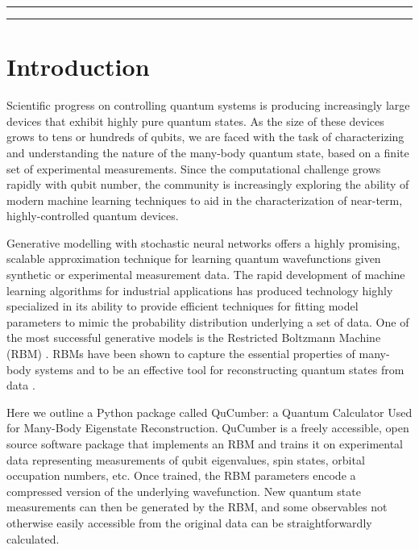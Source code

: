 \documentclass[submission, Phys]{SciPost}
\begin{document}
\vspace{10pt}
\noindent\rule{\textwidth}{1pt}
\tableofcontents\thispagestyle{fancy}
\noindent\rule{\textwidth}{1pt}
\vspace{10pt}


\section{Introduction}

Scientific progress on controlling quantum systems is producing increasingly large devices that exhibit highly pure quantum states.  As the size of these devices grows to tens or hundreds of qubits, we are faced with the task of characterizing and understanding the nature of the many-body quantum state, based on a finite set of experimental measurements.  Since the computational challenge grows rapidly with qubit number, the community is increasingly exploring the ability of modern machine learning techniques to aid in the characterization of near-term, highly-controlled quantum devices.

Generative modelling with stochastic neural networks offers a highly promising, scalable approximation technique for learning quantum wavefunctions given synthetic or experimental measurement data.  The rapid development of machine learning algorithms for industrial applications has produced technology highly specialized in its ability to provide efficient techniques for fitting model parameters to mimic the probability distribution underlying a set of data.  One of the most successful generative models is the Restricted Boltzmann Machine (RBM) \cite{Smolensky}.  RBMs have been shown to capture the essential properties of many-body systems and to be an effective tool for reconstructing quantum states from data \cite{Torlai2016thermo, torlai2018tomography, CarleoTroyer2017Science,ChenWang2018,GlasserCirac2018}.

Here we outline a Python package called QuCumber: a Quantum Calculator Used for Many-Body Eigenstate Reconstruction.  QuCumber is a freely accessible, open source software package that implements an RBM and trains it on experimental data representing measurements of qubit eigenvalues, spin states, orbital occupation numbers, etc.  Once trained, the RBM parameters encode a compressed version of the underlying wavefunction.  New quantum state measurements can then be generated by the RBM, and some observables not otherwise easily accessible from the original data can be straightforwardly calculated.
\end{document}
